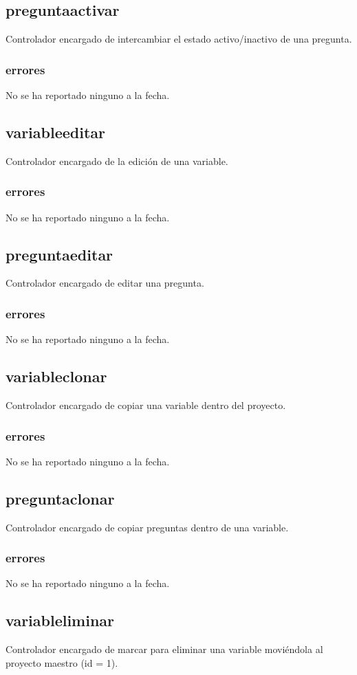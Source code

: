 \documentclass[10pt,a4paper]{book}
\begin{document}
	\subsection{preguntaactivar}
	Controlador encargado de intercambiar el estado activo/inactivo de una pregunta.
	\subsubsection{errores}
	No se ha reportado ninguno a la fecha.

	\subsection{variableeditar}
	Controlador encargado de la edición de una variable.
	\subsubsection{errores}
	No se ha reportado ninguno a la fecha.

	\subsection{preguntaeditar}
	Controlador encargado de editar una pregunta.
	\subsubsection{errores}
	No se ha reportado ninguno a la fecha.

	\subsection{variableclonar}
	Controlador encargado de copiar una variable dentro del proyecto.
	\subsubsection{errores}
	No se ha reportado ninguno a la fecha.

	\subsection{preguntaclonar}
	Controlador encargado de copiar preguntas dentro de una variable.
	\subsubsection{errores}
	No se ha reportado ninguno a la fecha.

	\subsection{variableliminar}
	Controlador encargado de marcar para eliminar una variable moviéndola al proyecto maestro (id = 1).
\end{document}
